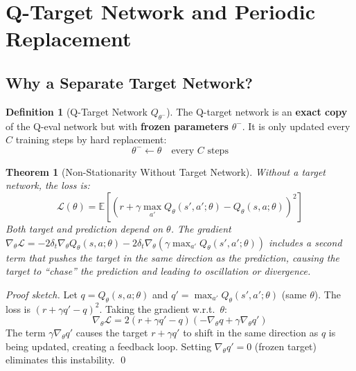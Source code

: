 \documentclass[12pt,a4paper]{article}
\theoremstyle{definition}
\newtheorem{definition}{Definition}[section]
\theoremstyle{plain}
\newtheorem{theorem}{Theorem}[section]
\theoremstyle{remark}
\newcommand{\Loss}{\mathcal{L}}
\newcommand{\Qeval}{Q_\theta}
\newcommand{\Qtgt}{Q_{\theta^-}}
\newcommand{\EE}{\mathbb{E}}
\begin{document}
\newpage
\section{Q-Target Network and Periodic Replacement}
\label{sec:qtarget}

\subsection{Why a Separate Target Network?}

\begin{definition}[Q-Target Network $\Qtgt$]
The Q-target network is an \textbf{exact copy} of the Q-eval network but with \textbf{frozen parameters} $\theta^-$. It is only updated every $C$ training steps by hard replacement:
\[
  \theta^- \gets \theta \quad \text{every } C \text{ steps}
\]
\end{definition}

\begin{theorem}[Non-Stationarity Without Target Network]
Without a target network, the loss is:
\[
  \Loss(\theta) = \EE\!\left[\left(r + \gamma\max_{a'}\Qeval(s',a';\theta) - \Qeval(s,a;\theta)\right)^2\right]
\]
Both target and prediction depend on $\theta$. The gradient
$\nabla_\theta \Loss = -2\delta_t \nabla_\theta \Qeval(s,a;\theta) - 2\delta_t \nabla_\theta (\gamma \max_{a'} \Qeval(s',a';\theta))$
includes a \emph{second term that pushes the target in the same direction as the prediction}, causing the target to ``chase'' the prediction and leading to oscillation or divergence.
\end{theorem}

\begin{proof}[Proof sketch]
Let $q = \Qeval(s,a;\theta)$ and $q' = \max_{a'}\Qeval(s',a';\theta)$ (same $\theta$). The loss is $(r + \gamma q' - q)^2$. Taking the gradient w.r.t.\ $\theta$:
\[
  \nabla_\theta \Loss = 2(r + \gamma q' - q)\left(-\nabla_\theta q + \gamma \nabla_\theta q'\right)
\]
The term $\gamma \nabla_\theta q'$ causes the target $r + \gamma q'$ to shift in the same direction as $q$ is being updated, creating a feedback loop. Setting $\nabla_\theta q' = 0$ (frozen target) eliminates this instability. \qed
\end{proof}
\end{document}

